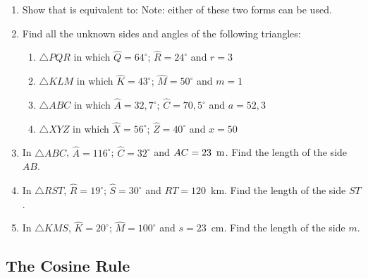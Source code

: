 {
\begin{enumerate}
\item Show that
is equivalent to:
Note: either of these two forms can be used.
\item Find all the unknown sides and angles of the following triangles:
	\begin{enumerate}
	\item $\triangle PQR$ in which $\hat{Q} = 64^\circ$; $\hat{R} = 24^\circ$ and $r=3$
	\item $\triangle KLM$ in which $\hat{K} = 43^\circ$; $\hat{M} = 50^\circ$ and $m=1$
	\item $\triangle ABC$ in which $\hat{A} = 32,7^\circ$; $\hat{C} = 70,5^\circ$ and $a=52,3$
	\item $\triangle XYZ$ in which $\hat{X} = 56^\circ$; $\hat{Z} = 40^\circ$ and $x=50$
	\end{enumerate}
\item In $\triangle ABC$, $\hat{A} = 116^\circ$;  $\hat{C} = 32^\circ$ and $AC = 23~\,\rm{m}$. Find the length of the side $AB$.
\item In $\triangle RST$, $\hat{R} = 19^\circ$;  $\hat{S} = 30^\circ$ and $RT = 120$~km. Find the length of the side $ST$.
\item In $\triangle KMS$, $\hat{K} = 20^\circ$;  $\hat{M} = 100^\circ$ and $s = 23$~cm. Find the length of the side $m$.
\end{enumerate}


\practiceinfo}

\subsection{The Cosine Rule}


